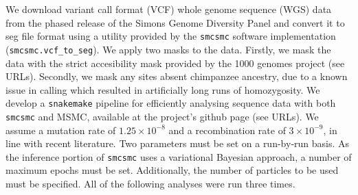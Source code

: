 \documentclass{article}
\begin{document}
We download variant call format (VCF) whole genome sequence (WGS) data from the phased release of the Simons Genome Diversity Panel and convert it to seg file format using a utility provided by the {\tt smcsmc} software implementation ({\tt smcsmc.vcf\_to\_seg}). We apply two masks to the data. Firstly, we mask the data with the strict accesibility mask provided by the 1000 genomes project (see URLs). Secondly, we mask any sites absent chimpanzee ancestry, due to a known issue in calling which resulted in artificially long runs of homozygosity. We develop a {\tt snakemake} pipeline for efficiently analysing sequence data with both {\tt smcsmc} and MSMC, available at the project's github page (see URLs). We assume a mutation rate of $1.25\times10^{-8}$ and a recombination rate of $3\times10^{-9}$, in line with recent literature. Two parameters must be set on a run-by-run basis. As the inference portion of {\tt smcsmc} uses a variational Bayesian approach, a number of maximum epochs must be set. Additionally, the number of particles to be used must be specified. All of the following analyses were run three times. 
\end{document}

